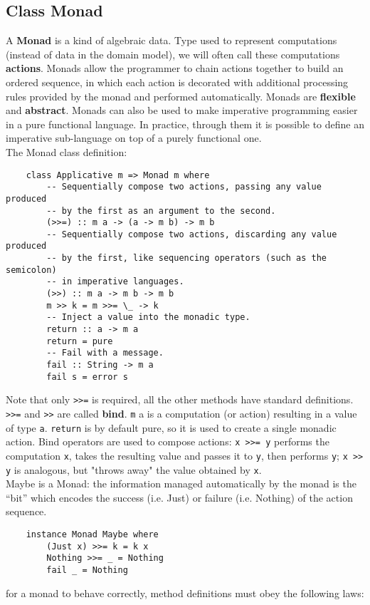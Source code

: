 \subsection{Class Monad}
A \textbf{Monad} is a kind of algebraic data.
Type used to represent computations (instead of data in the domain model), we will often call these computations \textbf{actions}.
Monads allow the programmer to chain actions together to build an ordered sequence, in which each action is decorated with additional processing rules provided by the monad and performed automatically.
Monads are \textbf{flexible} and \textbf{abstract}.
Monads can also be used to make imperative programming easier in a pure functional language.
In practice, through them it is possible to define an imperative sub-language on top of a purely functional one.\\
The Monad class definition:
\begin{lstlisting}
	class Applicative m => Monad m where
		-- Sequentially compose two actions, passing any value produced
		-- by the first as an argument to the second.
		(>>=) :: m a -> (a -> m b) -> m b
		-- Sequentially compose two actions, discarding any value produced
		-- by the first, like sequencing operators (such as the semicolon)
		-- in imperative languages.
		(>>) :: m a -> m b -> m b
		m >> k = m >>= \_ -> k
		-- Inject a value into the monadic type.
		return :: a -> m a
		return = pure
		-- Fail with a message.
		fail :: String -> m a
		fail s = error s
\end{lstlisting}
Note that only \texttt{>>=} is required, all the other methods have standard definitions.
\texttt{>>=} and \texttt{>>} are called \textbf{bind}.
\texttt{m} a is a computation (or action) resulting in a value of type \texttt{a}.
\texttt{return} is by default pure, so it is used to create a single monadic action.
Bind operators are used to compose actions:
\texttt{x >>= y} performs the computation \texttt{x}, takes the resulting value and passes it to \texttt{y}, then performs \texttt{y};
\texttt{x >> y} is analogous, but "throws away" the value obtained by \texttt{x}.\\
Maybe is a Monad: the information managed automatically by the monad is the “bit” which encodes the success (i.e. Just) or failure (i.e. Nothing) of the action sequence.
\begin{lstlisting}
	instance Monad Maybe where
		(Just x) >>= k = k x
		Nothing >>= _ = Nothing
		fail _ = Nothing
\end{lstlisting}
for a monad to behave correctly, method definitions must obey the following laws:
